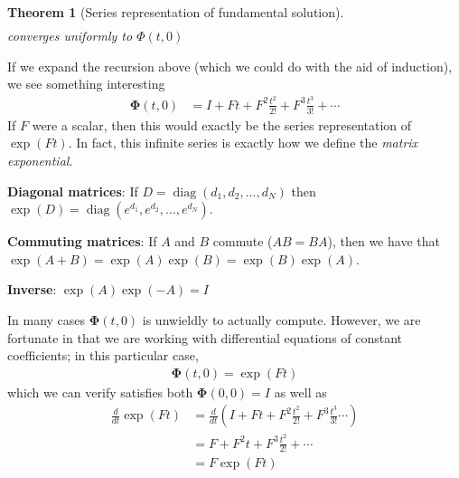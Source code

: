 \documentclass[a4paper,11pt]{exam}
\newtheorem{theorem}{Theorem}
\newcounter{ct}
\newcommand{\fundamentalSolution}{\boldsymbol{\Phi}}
\DeclareMathOperator*{\diag}{diag}
\begin{document}
\begin{questions}
\begin{tcolorbox}[colback=black!1!,title=Fundamental Solution]
\begin{theorem}[Series representation of fundamental solution]
\begin{align}
        \end{align}
        converges uniformly to $\Phi(t, 0)$
    \end{theorem}
    If we expand the recursion above (which we could do with the aid of induction), we see something interesting
    \begin{align}
        \fundamentalSolution(t, 0) &= I + Ft + F^2 \frac{t^2}{2!} + F^3 \frac{t^3}{3!} + \cdots
    \end{align}
    If $F$ were a scalar, then this would exactly be the series representation of $\exp(Ft)$.  In fact, this infinite series is exactly how we define the \textit{matrix exponential}.
\end{tcolorbox}

\begin{tcolorbox}[colback=black!1!,title=Properties of the matrix exponential]
    \textbf{Diagonal matrices}: If $D = \diag(d_1, d_2, \ldots, d_N)$ then $\exp(D) = \diag(e^{d_1}, e^{d_2}, \ldots, e^{d_N} )$.\newline

    \textbf{Commuting matrices}: If $A$ and $B$ commute ($AB = BA$), then we have that $\exp(A + B) = \exp(A) \exp(B) = \exp(B) \exp(A)$.\newline

    \textbf{Inverse}: $\exp(A) \exp(-A) = I$
\end{tcolorbox}

In many cases $\fundamentalSolution(t, 0)$ is unwieldly to actually compute.  However, we are fortunate in that we are working with differential equations of constant coefficients; in this particular case, 
\begin{align}
    \fundamentalSolution(t, 0) = \exp(F t)
\end{align}
which we can verify satisfies both $\fundamentalSolution(0, 0) = I$ as well as
\begin{align}
    \frac{d}{dt} \exp(Ft) &= \frac{d}{dt} \left(I + Ft + F^2 \frac{t^2}{2!} + F^3 \frac{t^3}{3!}\cdots  \right)\\
    &= F + F^2 t + F^3 \frac{t^2}{2!} + \cdots\\
    &= F \exp(F t)
\end{align}

\end{questions}
\end{document}
